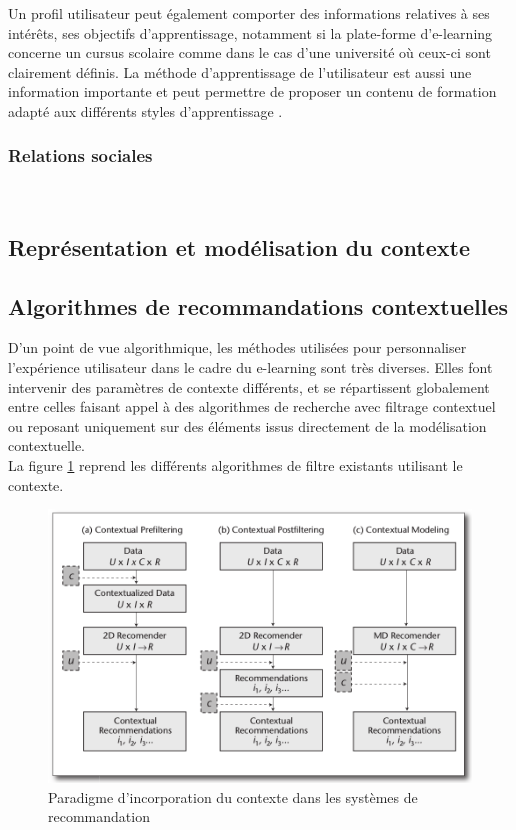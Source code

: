 \documentclass[conference]{./sty/IEEEtran}
\begin{document}
Un profil utilisateur peut également comporter des informations relatives à ses
intérêts, ses objectifs d'apprentissage, notamment si la plate-forme
d'e-learning concerne un cursus scolaire comme dans le cas d'une université où
ceux-ci sont clairement définis. La méthode d'apprentissage de l'utilisateur
est aussi une information importante et peut permettre de proposer un contenu
de formation adapté aux différents styles d'apprentissage
\cite{smartECourseRecommander}. \\

\subsubsection{Relations sociales}
~\\

\subsection{Représentation et modélisation du contexte}

\subsection{Algorithmes de recommandations contextuelles}

D'un point de vue algorithmique, les méthodes utilisées pour personnaliser
l'expérience utilisateur dans le cadre du e-learning sont très diverses. Elles
font intervenir des paramètres de contexte différents, et se répartissent
globalement entre celles faisant appel à des algorithmes de recherche avec
filtrage contextuel ou reposant uniquement sur des éléments issus directement
de la modélisation contextuelle. \\

La figure \ref{fig:algos} reprend les différents algorithmes de filtre
existants utilisant le contexte. \\

\begin{figure}[tb]
  \centering
  \caption{\label{fig:algos} Paradigme d'incorporation du contexte dans les systèmes de recommandation \cite{DBLP:journals/aim/AdomaviciusMRT11}}
  \includegraphics[width=\textwidth]{algo}
\end{figure}
\end{document}
